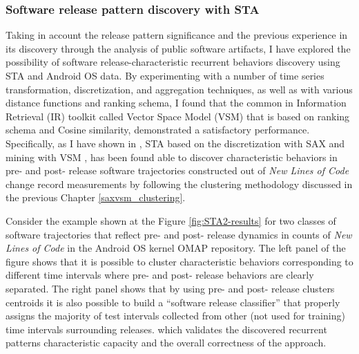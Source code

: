 \subsubsection{Software release pattern discovery with STA}
Taking in account the release pattern significance and the previous experience in its discovery through the analysis of 
public software artifacts, I have explored the possibility of software release-characteristic recurrent behaviors discovery using 
STA and Android OS data.
By experimenting with a number of time series transformation, discretization, and aggregation techniques, as well as with various 
distance functions and ranking schema, I found that the common in Information Retrieval (IR) toolkit called Vector Space Model 
(VSM) \cite{citeulike:300428} that is based on \tfidf ranking schema and Cosine similarity, demonstrated a satisfactory performance. 
Specifically, as I have shown in \cite{csdl2-11-10}, STA based on the discretization with SAX \cite{sax} and mining with VSM 
\cite{citeulike:300428}, has been found able to discover characteristic behaviors in pre- and post- release software trajectories 
constructed out of \textit{New Lines of Code} change record measurements by following the clustering methodology discussed
in the previous Chapter \ref{saxvsm_clustering}. 

Consider the example shown at the Figure \ref{fig:STA2-results} for two classes of software trajectories that reflect pre- and post- 
release dynamics in counts of \textit{New Lines of Code} in the Android OS kernel OMAP repository. 
The left panel of the figure shows that it is possible to cluster characteristic behaviors corresponding to different time intervals 
where pre- and post- release behaviors are clearly separated. 
The right panel shows that by using pre- and post- release clusters centroids it is also possible to build a ``software release classifier''
that properly assigns the majority of test intervals collected from other (not used for training) time intervals surrounding releases. 
which validates the discovered recurrent patterns characteristic capacity and the overall correctness of the approach.


